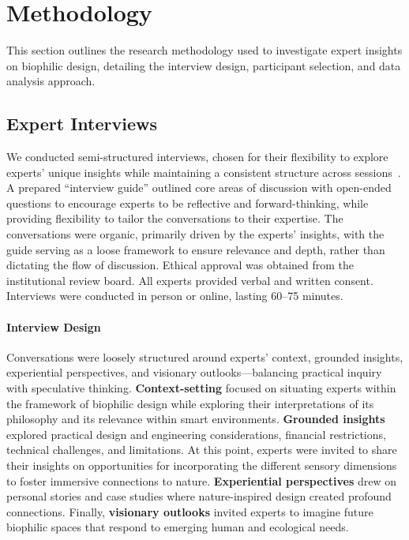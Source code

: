 \section{Methodology}
\label{sec:ch4-methodology}
This section outlines the research methodology used to investigate expert insights on biophilic design, detailing the interview design, participant selection, and data analysis approach.

\subsection{Expert Interviews}
We conducted semi-structured interviews, chosen for their flexibility to explore experts’ unique insights while maintaining a consistent structure across sessions~\cite{blandford2013semi}. A prepared ``interview guide'' outlined core areas of discussion with open-ended questions to encourage experts to be reflective and forward-thinking, while providing flexibility to tailor the conversations to their expertise. The conversations were organic, primarily driven by the experts' insights, with the guide serving as a loose framework to ensure relevance and depth, rather than dictating the flow of discussion. Ethical approval was obtained from the institutional review board. All experts provided verbal and written consent. Interviews were conducted in person or online, lasting 60–75 minutes.

\paragraph{Interview Design}
Conversations were loosely structured around experts’ context, grounded insights, experiential perspectives, and visionary outlooks---balancing practical inquiry with speculative thinking. \textbf{Context-setting} focused on situating experts within the framework of biophilic design while exploring their interpretations of its philosophy and its relevance within smart environments. \textbf{Grounded insights} explored practical design and engineering considerations, financial restrictions, technical challenges, and limitations. At this point, experts were invited to share their insights on  opportunities for incorporating the different sensory dimensions to foster immersive connections to nature. \textbf{Experiential perspectives} drew on personal stories and case studies where nature-inspired design created profound connections. Finally, \textbf{visionary outlooks} invited experts to imagine future biophilic spaces that respond to emerging human and ecological needs.

